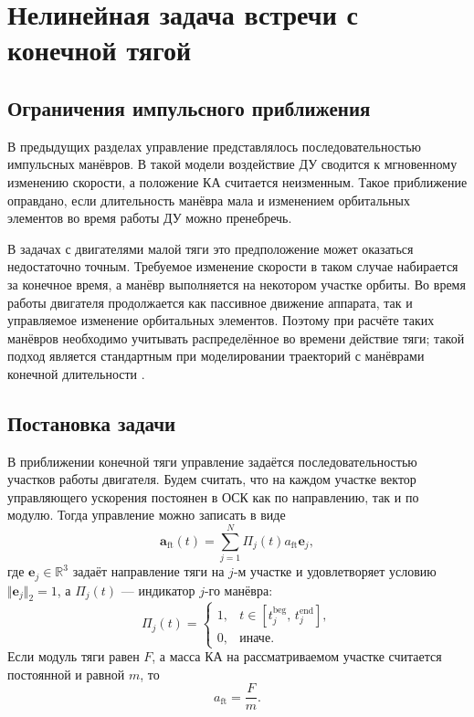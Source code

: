 \section{Нелинейная задача встречи с конечной тягой}

\subsection{Ограничения импульсного приближения}

В предыдущих разделах управление представлялось последовательностью импульсных манёвров. В такой модели воздействие ДУ сводится к мгновенному изменению скорости, а положение КА считается неизменным. Такое приближение оправдано, если длительность манёвра мала и изменением орбитальных элементов во время работы ДУ можно пренебречь.

В задачах с двигателями малой тяги это предположение может оказаться недостаточно точным. Требуемое изменение скорости в таком случае набирается за конечное время, а манёвр выполняется на некотором участке орбиты. Во время работы двигателя продолжается как пассивное движение аппарата, так и управляемое изменение орбитальных элементов. Поэтому при расчёте таких манёвров необходимо учитывать распределённое во времени действие тяги; такой подход является стандартным при моделировании траекторий с манёврами конечной длительности \cite{morante2021survey, scarritt2012finite}.

\subsection{Постановка задачи}

В приближении конечной тяги управление задаётся последовательностью участков работы двигателя. Будем считать, что на каждом участке вектор управляющего ускорения постоянен в ОСК как по направлению, так и по модулю. Тогда управление можно записать в виде
\begin{equation}
    \mathbf{a}_{\text{ft}}(t) = \sum_{j=1}^{N} \Pi_j(t) a_{\text{ft}} \mathbf{e}_j,
\end{equation}
где $\mathbf{e}_j \in \mathbb{R}^{3}$ задаёт направление тяги на $j$-м участке и удовлетворяет условию $\Vert \mathbf{e}_j \Vert_2 = 1$, а $\Pi_j(t)$ --- индикатор $j$-го манёвра:
\begin{equation}
    \Pi_j(t)=
    \begin{cases}
        1, & t \in [t_j^{\text{beg}},\, t_j^{\text{end}}],\\
        0, & \text{иначе}.
    \end{cases}
\end{equation}
Если модуль тяги равен $F$, а масса КА на рассматриваемом участке считается постоянной и равной $m$, то
\begin{equation}
    a_{\text{ft}} = \frac{F}{m}.
\end{equation}

